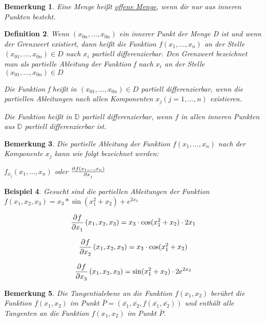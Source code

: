 \documentclass[fontset=ubuntu,12pt,a4paper]{scrreprt}
\newtheorem{defi}{Definition}[section]
\newtheorem{bemerkung}[defi]{Bemerkung}
\newtheorem{beispiel}[defi]{Beispiel}
\begin{document}
\begin{bemerkung}
    Eine Menge heißt \underline{offene Menge}, wenn dir nur aus inneren Punkten besteht.
\end{bemerkung}

\begin{defi}
    Wenn \((x_{0n},\dots,x_{0n})\) ein innerer Punkt der Menge D ist und wenn der Grenzwert existiert, dann heißt die Funktion \(f(x_1,\dots,x_n)\) an der Stelle \((x_{01},\dots,x_{0n})\in D\) nach \(x_i\) partiell differenzierbar. Den Grenzwert bezeichnet man als partielle Ableitung der Funktion f nach \(x_i\) an der Stelle \((x_{01},\dots,x_{0n}) \in D\)
    
    Die Funktion f heißt in \((x_{01},\dots,x_{0n}) \in D\) partiell differenzierbar, wenn die partiellen Ableitungen nach allen Komponenten \(x_j (j=1,\dots,n)\) existieren.
    
    Die Funktion heißt in \(\mathbb{D}\) partiell differenzierbar, wenn \(f\) in allen inneren Punkten aus \(\mathbb{D}\) partiell differenzierbar ist.
\end{defi}

\begin{bemerkung}
    Die partielle Ableitung der Funktion \(f(x_1,\dots,x_n)\) nach der Komponente \(x_j\) kann wie folgt bezeichnet werden:
    
    \(f_{x_j}(x_1,\dots,x_n)\) oder \(\pd{f(x_1,\dots,x_n)}{x_j}\)
\end{bemerkung}
\begin{beispiel}
    Gesucht sind die partiellen Ableitungen der Funktion
    \(f(x_1,x_2,x_3)=x_3*\sin(x_1^2+x_2)+e^{2x_3}\)
    
    \[\dpd{f}{x_1}(x_1,x_2,x_3)=x_3\cdot\cos(x_1^2+x_2)\cdot2x_1\]
    
    \[\dpd{f}{x_2}(x_1,x_2,x_3)=x_3\cdot\cos(x_1^2+x_2)\]
        
    \[\dpd{f}{x_3}(x_1,x_2,x_3)=\sin(x_1^2+x_2)\cdot2e^{2x_3}\]
\end{beispiel}

\begin{bemerkung}
    Die Tangentialebene an die Funktion \(f(x_1,x_2)\) berührt die Funktion \(f(x_1,x_2)\) im Punkt \(\bar{P}=(\bar{x_1},\bar{x_2},f(\bar{x_1},\bar{x_2}))\) und enthält alle Tangenten an die Funktion \(f(x_1,x_2)\) im Punkt \(\bar{P}\).
\end{bemerkung}
\end{document}

